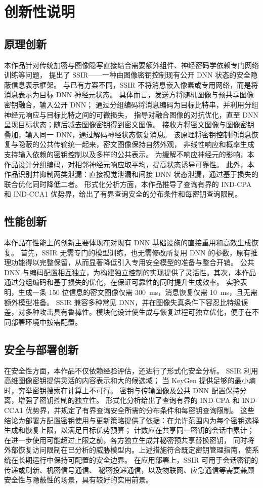 \section{创新性说明}
\subsection{原理创新}
本作品针对传统加密与图像隐写直接结合需要额外组件、神经密码学依赖专门网络训练等问题，
提出了 SSIR——一种由图像密钥控制现有公开 DNN 状态的安全隐蔽信息表示框架。
与已有方案不同，SSIR 不将消息嵌入像素或专用网络，而是将消息表示为目标 DNN 神经元状态。
具体而言，发送方将随机图像与预共享图像密钥融合，输入公开 DNN；
通过分组编码将消息编码为目标比特串，并利用分组神经元响应与目标比特之间的可微损失，
指导对融合图像的对抗优化，直至 DNN 呈现目标状态；随后减去图像密钥得到密文图像。
接收方将密文图像与图像密钥叠加，输入同一 DNN，通过解码神经状态恢复消息。
该原理将密钥控制的消息恢复与隐蔽的公共传输统一起来，密文图像保持自然外观，
非线性响应和概率生成支持输入依赖的密钥控制以及多样的公共表示。
为缓解不响应神经元的影响，本作品设计分组编码，对相邻神经元响应取平均，提高状态诱导可靠性。
此外，本作品识别并抑制两类泄漏：直接视觉泄漏和间接 DNN 状态泄漏，通过基于损失的联合优化同时降低二者。
形式化分析方面，本作品推导了查询有界的 IND-CPA 和 IND-CCA1 优势界，给出了有界查询安全的分布条件和每密钥查询限制。

\subsection{性能创新}
本作品在性能上的创新主要体现在对现有 DNN 基础设施的直接重用和高效生成恢复。
首先，SSIR 无需专门的模型训练，也无需修改所复用 DNN 的参数，原有推理功能得以完整保留，从而显著降低引入专用安全模型的准备与整合开销。
公共 DNN 与编码配置相互独立，为构建独立控制的实现提供了灵活性。其次，本作品通过分组编码和基于损失的优化，在保证可靠性的同时提升生成效率。
实验表明，生成一条 150 位信息的密文图像仅需 300~ms，消息恢复仅需 10~ms，且无需额外模型准备。
SSIR 兼容多种常见 DNN，并在图像失真条件下容忍比特级误差，对多种攻击具有鲁棒性。模块化设计使生成与恢复过程可独立优化，便于在不同部署环境中按需配置。

\subsection{安全与部署创新}
在安全性方面，本作品不仅依赖经验评估，还进行了形式化安全分析。
SSIR 利用高维图像密钥提供灵活的内容表示和大的候选域；
当 KeyGen 提供足够的最小熵时，穷举密钥搜索在计算上不可行。
密钥与传输图像及公共 DNN 配置保持分离，增强了密钥控制的独立性。
形式化分析给出了查询有界的 IND-CPA 和 IND-CCA1 优势界，并规定了有界查询安全所需的分布条件和每密钥查询限制。
这些结论为部署方配置密钥使用与更新策略提供了依据：在允许范围内为每个密钥选择生成和恢复上限，以满足目标优势预算；
计数应在共享同一密钥的会话中累计；在进一步使用可能超过上限之前，各方独立生成并秘密预共享替换密钥，
同时将外部恢复访问限制在已分析的威胁模型内。上述措施符合既定密钥管理指南\supercite{26-barker-2020}，使系统在长期运行中保持可配置的安全边界。
在应用部署上，SSIR 可用于会话密钥的传递或刷新、机密信号通信、
秘密投递通信，以及物联网、应急通信等需要兼顾安全性与隐蔽性的场景，具有较好的实用前景。